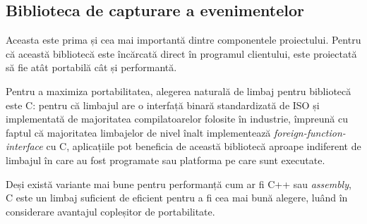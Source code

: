 \subsection{Biblioteca de capturare a evenimentelor}\label{library}
Aceasta este prima și cea mai importantă dintre componentele
proiectului. Pentru că această bibliotecă este încărcată direct în
programul clientului, este proiectată să fie atât portabilă cât și
performantă.

Pentru a maximiza portabilitatea, alegerea naturală de limbaj
pentru bibliotecă este C\cite{C}: pentru că limbajul are o interfață
binară standardizată de ISO și implementată de majoritatea
compilatoarelor folosite în industrie, împreună cu faptul că majoritatea
limbajelor de nivel înalt implementează
\textit{foreign-function-interface} cu C, aplicațiile pot beneficia de
această bibliotecă aproape indiferent de limbajul în care au fost
programate sau platforma pe care sunt executate.

Deși există variante mai bune pentru performanță cum ar fi C++ sau
\textit{assembly}, C este un limbaj suficient de eficient pentru a fi
cea mai bună alegere, luând în considerare avantajul copleșitor de
portabilitate.

